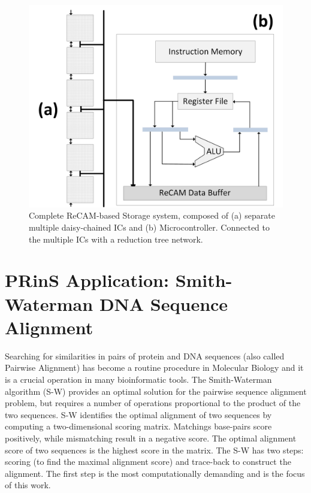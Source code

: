 \documentclass{superfri}
\begin{document}
	\begin{figure}[h!]
		\centerline{\includegraphics[scale=0.5]{Figures/ReCAM_Single_IC_Column.jpg}}
		\caption{Complete ReCAM-based Storage system, composed of (a) separate multiple daisy-chained ICs and (b) Microcontroller. Connected to the multiple ICs with a reduction tree network.}
		\label{fig:ReCAM_system}
	\end{figure}
	
	\section{PRinS Application: Smith-Waterman DNA Sequence Alignment}
	\label{sec:smith_waterman}
	
	Searching for similarities in pairs of protein and DNA sequences (also called Pairwise Alignment) has become a routine procedure in Molecular Biology and it is a crucial operation in many bioinformatic tools. The Smith-Waterman algorithm (S-W) \cite{smith1981identification} provides an optimal solution for the pairwise sequence alignment problem, but requires a number of operations proportional to the product of the two sequences. 
	S-W identifies the optimal alignment of two sequences by computing a two-dimensional scoring matrix. Matchings base-pairs score positively, while mismatching result in a negative score. The optimal alignment score of two sequences is the highest score in the matrix. The S-W has two steps: scoring (to find the maximal alignment score) and trace-back to construct the alignment. The first step is the most computationally demanding and is the focus of this work.
	
\end{document}
